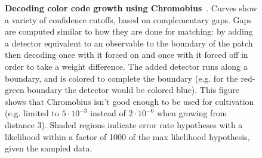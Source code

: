 \documentclass[onecolumn,unpublished,a4paper]{quantumarticle}
\theoremstyle{definition}
\begin{document}
\begin{figure}
    \begin{adjustwidth}{-2.5cm}{-2.5cm}
        \centering
    \end{adjustwidth}
    \caption{
        \textbf{Decoding color code growth using Chromobius}~\cite{gidney2023colorcode}.
        Curves show a variety of confidence cutoffs, based on complementary gaps.
        Gaps are computed similar to how they are done for matching: by adding a detector equivalent to an observable to the boundary of the patch then decoding once with it forced on and once with it forced off in order to take a weight difference.
        The added detector runs along a boundary, and is colored to complete the boundary (e.g. for the red-green boundary the detector would be colored blue).
        This figure shows that Chromobius isn't good enough to be used for cultivation (e.g. limited to $5 \cdot 10^{-3}$ instead of $2 \cdot 10^{-6}$ when growing from distance 3).
        Shaded regions indicate error rate hypotheses with a likelihood within a factor of 1000 of the max likelihood hypothesis, given the sampled data.
    }
    \label{fig:color-code-growth-difficulty}
\end{figure}
\end{document}
